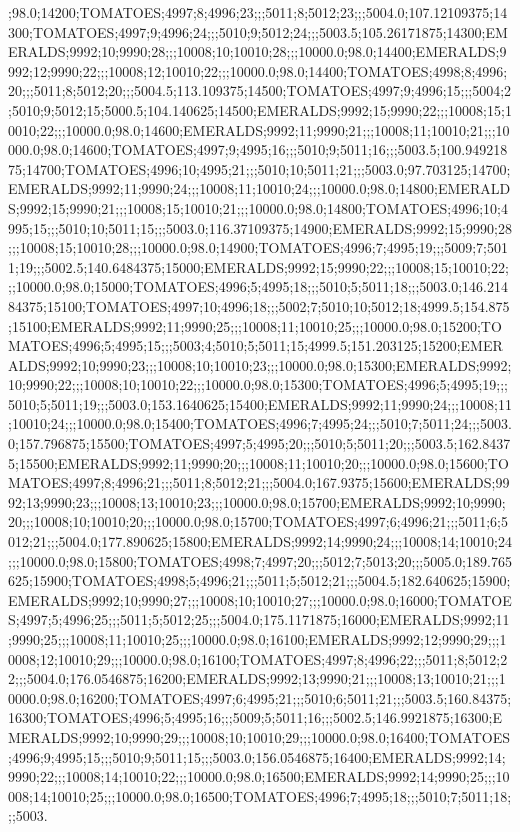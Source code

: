 ;98.0;14200;TOMATOES;4997;8;4996;23;;;5011;8;5012;23;;;5004.0;107.12109375;14300;TOMATOES;4997;9;4996;24;;;5010;9;5012;24;;;5003.5;105.26171875;14300;EMERALDS;9992;10;9990;28;;;10008;10;10010;28;;;10000.0;98.0;14400;EMERALDS;9992;12;9990;22;;;10008;12;10010;22;;;10000.0;98.0;14400;TOMATOES;4998;8;4996;20;;;5011;8;5012;20;;;5004.5;113.109375;14500;TOMATOES;4997;9;4996;15;;;5004;2;5010;9;5012;15;5000.5;104.140625;14500;EMERALDS;9992;15;9990;22;;;10008;15;10010;22;;;10000.0;98.0;14600;EMERALDS;9992;11;9990;21;;;10008;11;10010;21;;;10000.0;98.0;14600;TOMATOES;4997;9;4995;16;;;5010;9;5011;16;;;5003.5;100.94921875;14700;TOMATOES;4996;10;4995;21;;;5010;10;5011;21;;;5003.0;97.703125;14700;EMERALDS;9992;11;9990;24;;;10008;11;10010;24;;;10000.0;98.0;14800;EMERALDS;9992;15;9990;21;;;10008;15;10010;21;;;10000.0;98.0;14800;TOMATOES;4996;10;4995;15;;;5010;10;5011;15;;;5003.0;116.37109375;14900;EMERALDS;9992;15;9990;28;;;10008;15;10010;28;;;10000.0;98.0;14900;TOMATOES;4996;7;4995;19;;;5009;7;5011;19;;;5002.5;140.6484375;15000;EMERALDS;9992;15;9990;22;;;10008;15;10010;22;;;10000.0;98.0;15000;TOMATOES;4996;5;4995;18;;;5010;5;5011;18;;;5003.0;146.21484375;15100;TOMATOES;4997;10;4996;18;;;5002;7;5010;10;5012;18;4999.5;154.875;15100;EMERALDS;9992;11;9990;25;;;10008;11;10010;25;;;10000.0;98.0;15200;TOMATOES;4996;5;4995;15;;;5003;4;5010;5;5011;15;4999.5;151.203125;15200;EMERALDS;9992;10;9990;23;;;10008;10;10010;23;;;10000.0;98.0;15300;EMERALDS;9992;10;9990;22;;;10008;10;10010;22;;;10000.0;98.0;15300;TOMATOES;4996;5;4995;19;;;5010;5;5011;19;;;5003.0;153.1640625;15400;EMERALDS;9992;11;9990;24;;;10008;11;10010;24;;;10000.0;98.0;15400;TOMATOES;4996;7;4995;24;;;5010;7;5011;24;;;5003.0;157.796875;15500;TOMATOES;4997;5;4995;20;;;5010;5;5011;20;;;5003.5;162.84375;15500;EMERALDS;9992;11;9990;20;;;10008;11;10010;20;;;10000.0;98.0;15600;TOMATOES;4997;8;4996;21;;;5011;8;5012;21;;;5004.0;167.9375;15600;EMERALDS;9992;13;9990;23;;;10008;13;10010;23;;;10000.0;98.0;15700;EMERALDS;9992;10;9990;20;;;10008;10;10010;20;;;10000.0;98.0;15700;TOMATOES;4997;6;4996;21;;;5011;6;5012;21;;;5004.0;177.890625;15800;EMERALDS;9992;14;9990;24;;;10008;14;10010;24;;;10000.0;98.0;15800;TOMATOES;4998;7;4997;20;;;5012;7;5013;20;;;5005.0;189.765625;15900;TOMATOES;4998;5;4996;21;;;5011;5;5012;21;;;5004.5;182.640625;15900;EMERALDS;9992;10;9990;27;;;10008;10;10010;27;;;10000.0;98.0;16000;TOMATOES;4997;5;4996;25;;;5011;5;5012;25;;;5004.0;175.1171875;16000;EMERALDS;9992;11;9990;25;;;10008;11;10010;25;;;10000.0;98.0;16100;EMERALDS;9992;12;9990;29;;;10008;12;10010;29;;;10000.0;98.0;16100;TOMATOES;4997;8;4996;22;;;5011;8;5012;22;;;5004.0;176.0546875;16200;EMERALDS;9992;13;9990;21;;;10008;13;10010;21;;;10000.0;98.0;16200;TOMATOES;4997;6;4995;21;;;5010;6;5011;21;;;5003.5;160.84375;16300;TOMATOES;4996;5;4995;16;;;5009;5;5011;16;;;5002.5;146.9921875;16300;EMERALDS;9992;10;9990;29;;;10008;10;10010;29;;;10000.0;98.0;16400;TOMATOES;4996;9;4995;15;;;5010;9;5011;15;;;5003.0;156.0546875;16400;EMERALDS;9992;14;9990;22;;;10008;14;10010;22;;;10000.0;98.0;16500;EMERALDS;9992;14;9990;25;;;10008;14;10010;25;;;10000.0;98.0;16500;TOMATOES;4996;7;4995;18;;;5010;7;5011;18;;;5003.